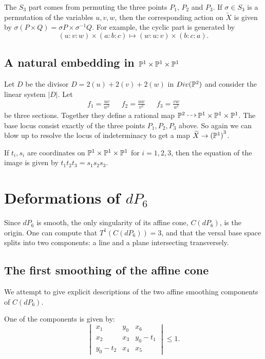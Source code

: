 \documentclass[11pt, english]{article}
\begin{document}
The $S_3$ part comes from permuting the three points $P_1$, $P_2$ and $P_3$. If $\sigma \in S_3$ is a permutation of the variables $u,v,w$, then the corresponding action on $\widetilde X$ is given by $\sigma (P \times Q)=\sigma P \times \sigma^{-1} Q$. For example, the cyclic part is generated by
$$
(u:v:w)\times (a:b:c) \mapsto (w:u:v) \times(b:c:a).
$$


\subsection{A natural embedding in $\mathbb{P}^1 \times \mathbb{P}^1 \times \mathbb{P}^1$}

Let $D$ be the divisor $D=2(u)+2(v)+2(w)$ in $Div(\mathbb{P}^2)$ and consider the linear system $\lvert D \rvert$. Let 
\begin{align*}
 f_1 = \frac{uv}{w^2} && f_2 = \frac{uw}{v^2} && f_3 = \frac{vw}{u^2}
\end{align*}
be three sections. Together they define a rational map $\PP^2 \rmap \PP^1 \times \PP^1 \times \PP^1$. The base locus consist exactly of the three points $P_1,P_2,P_3$ above. So again we can blow up to resolve the locus of indeterminacy to get a map $\widetilde X \to {(\mathbb{P}^1)}^3$.

If $t_i,s_i$ are coordinates on $\mathbb{P}^1 \times \mathbb{P}^1 \times \mathbb{P}^1$ for $i=1,2,3$, then the equation of the image is given by $t_1t_2t_3=s_1s_2s_3$. 

\section{Deformations of $dP_6$}

Since $dP_6$ is smooth, the only singularity of its affine cone, $C(dP_6)$, is the origin. One can compute that $T^1(C(dP_6))=3$, and that the versal base space splits into two components: a line and a plane intersecting transversely.

\subsection{The first smoothing of the affine cone}

We attempt to give explicit descriptions of the two affine smoothing components of $C(dP_6)$. 

One of the components is given by:
\[
\begin{vmatrix}
x_1 & y_0 & x_6 \\
x_2 & x_3 & y_0-t_1 \\
y_0-t_2 & x_4 & x_5
\end{vmatrix} \leq 1.
\]
\end{document}

